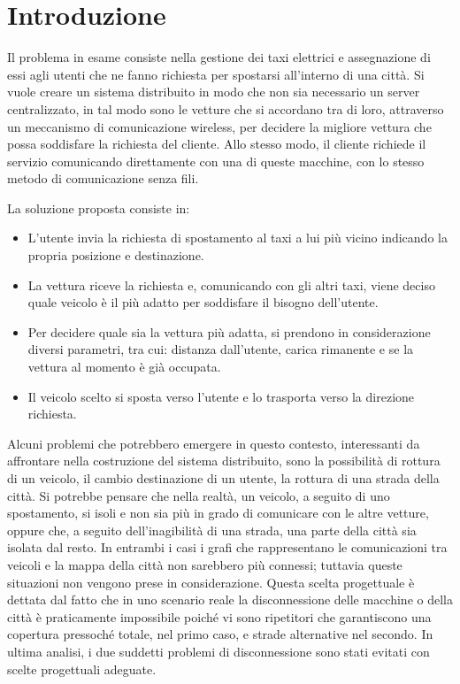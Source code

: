 \chapter{Introduzione}

Il problema in esame consiste nella gestione dei taxi elettrici e assegnazione di essi agli utenti che ne fanno richiesta per spostarsi all'interno di una città. Si vuole creare un sistema distribuito in modo che non sia necessario un server centralizzato, in tal modo sono le vetture che si accordano tra di loro, attraverso un meccanismo di comunicazione wireless, per decidere la migliore vettura che possa soddisfare la richiesta del cliente. Allo stesso modo, il cliente richiede il servizio comunicando direttamente con una di queste macchine, con lo stesso metodo di comunicazione senza fili. 

La soluzione proposta consiste in:
\begin{itemize}
	\item L'utente invia la richiesta di spostamento al taxi a lui più vicino indicando la propria posizione e destinazione.
	\item La vettura riceve la richiesta e, comunicando con gli altri taxi, viene deciso quale veicolo è il più adatto per soddisfare il bisogno dell'utente.
	\item Per decidere quale sia la vettura più adatta, si prendono in considerazione diversi parametri, tra cui: distanza dall'utente, carica rimanente e se la vettura al momento è già occupata.
	\item Il veicolo scelto si sposta verso l'utente e lo trasporta verso la direzione richiesta.
\end{itemize}

Alcuni problemi che potrebbero emergere in questo contesto, interessanti da affrontare nella costruzione del sistema distribuito, sono la possibilità di rottura di un veicolo, il cambio destinazione di un utente, la rottura di una strada della città.
Si potrebbe pensare che nella realtà, un veicolo, a seguito di uno spostamento, si isoli e non sia più in grado di comunicare con le altre vetture, oppure che, a seguito dell'inagibilità di una strada, una parte della città sia isolata dal resto. In entrambi i casi i grafi che rappresentano le comunicazioni tra veicoli e la mappa della città non sarebbero più connessi; tuttavia queste situazioni non vengono prese in considerazione. 
Questa scelta progettuale è dettata dal fatto che in uno scenario reale la disconnessione delle macchine o della città è praticamente impossibile poiché vi sono ripetitori che garantiscono una copertura pressoché totale, nel primo caso, e strade alternative nel secondo. In ultima analisi, i due suddetti problemi di disconnessione sono stati evitati con scelte progettuali adeguate.

